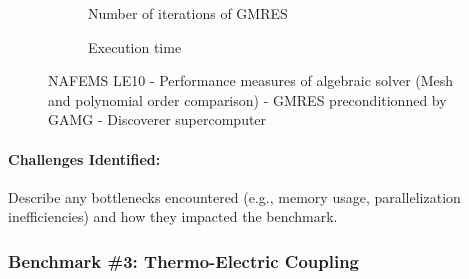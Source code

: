 \begin{figure}
  \begin{subfigure}[c]{\textwidth}
    \centering
    \caption{Number of iterations of GMRES}
  \end{subfigure}
  \begin{subfigure}[c]{\textwidth}
    \centering
    \caption{Execution time}
  \end{subfigure}
  \caption{NAFEMS LE10 - Performance measures of algebraic solver
    (Mesh and polynomial order comparison) - GMRES preconditionned by GAMG - Discoverer supercomputer}
\end{figure}


\paragraph{Challenges Identified:} Describe any bottlenecks encountered (e.g., memory usage, parallelization inefficiencies) and how they impacted the benchmark.


\subsubsection{Benchmark \#3: Thermo-Electric Coupling}
\label{sec:WP3:Feelpp:benchmark:hl-31}

